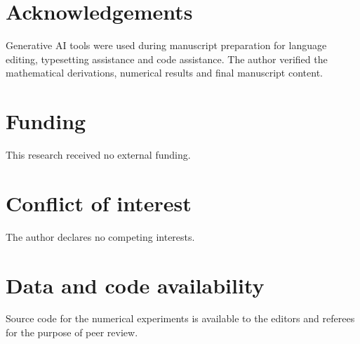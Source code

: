 \documentclass[11pt]{article}
\numberwithin{equation}{section}
\begin{document}
\section*{Acknowledgements}
Generative AI tools were used during manuscript preparation for language editing, typesetting assistance and code assistance. The author verified the mathematical derivations, numerical results and final manuscript content.

\section*{Funding}
This research received no external funding.

\section*{Conflict of interest}
The author declares no competing interests.

\section*{Data and code availability}
Source code for the numerical experiments is available to the editors and referees for the purpose of peer review.
\end{document}
